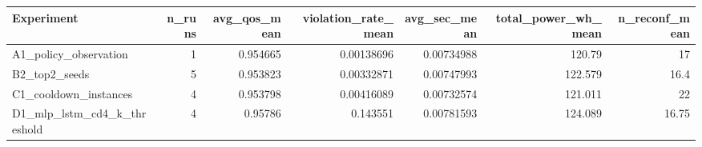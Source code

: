 \begin{tabular}{lrrrrrr}
\toprule
Experiment & n_runs & avg_qos_mean & violation_rate_mean & avg_sec_mean & total_power_wh_mean & n_reconf_mean \\
\midrule
A1_policy_observation & 1 & 0.954665 & 0.00138696 & 0.00734988 & 120.79 & 17 \\
B2_top2_seeds & 5 & 0.953823 & 0.00332871 & 0.00747993 & 122.579 & 16.4 \\
C1_cooldown_instances & 4 & 0.953798 & 0.00416089 & 0.00732574 & 121.011 & 22 \\
D1_mlp_lstm_cd4_k_threshold & 4 & 0.95786 & 0.143551 & 0.00781593 & 124.089 & 16.75 \\
\bottomrule
\end{tabular}
